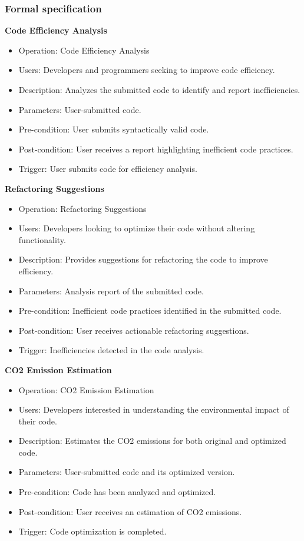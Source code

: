 \documentclass[conference,compsoc]{IEEEtran}
\begin{document}
\subsubsection{Formal specification}

\textbf{Code Efficiency Analysis}
\begin{itemize}
	\item Operation: Code Efficiency Analysis
	\item Users: Developers and programmers seeking to improve code efficiency.
	\item Description: Analyzes the submitted code to identify and report inefficiencies.
	\item Parameters: User-submitted code.
	\item Pre-condition: User submits syntactically valid code.
	\item Post-condition: User receives a report highlighting inefficient code practices.
	\item Trigger: User submits code for efficiency analysis.
\end{itemize}

\textbf{Refactoring Suggestions}
\begin{itemize}
	\item Operation: Refactoring Suggestions
	\item Users: Developers looking to optimize their code without altering functionality.
	\item Description: Provides suggestions for refactoring the code to improve efficiency.
	\item Parameters: Analysis report of the submitted code.
	\item Pre-condition: Inefficient code practices identified in the submitted code.
	\item Post-condition: User receives actionable refactoring suggestions.
	\item Trigger: Inefficiencies detected in the code analysis.
\end{itemize}

\textbf{CO2 Emission Estimation}
\begin{itemize}
	\item Operation: CO2 Emission Estimation
	\item Users: Developers interested in understanding the environmental impact of their code.
	\item Description: Estimates the CO2 emissions for both original and optimized code.
	\item Parameters: User-submitted code and its optimized version.
	\item Pre-condition: Code has been analyzed and optimized.
	\item Post-condition: User receives an estimation of CO2 emissions.
	\item Trigger: Code optimization is completed.
\end{itemize}
\end{document}
